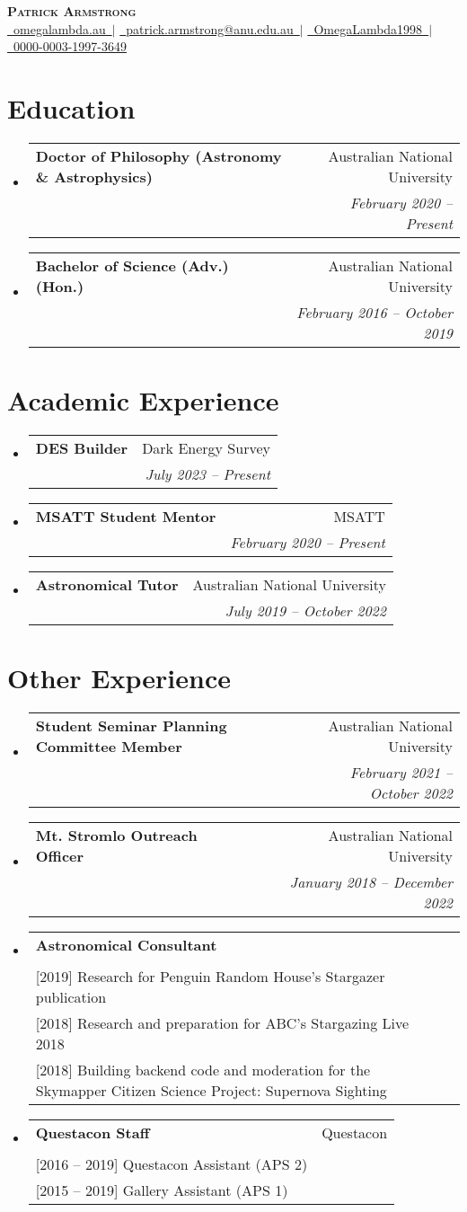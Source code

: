 \documentclass[letterpaper,11pt]{article}
\makeatletter
\newcommand{\resumeItem}[1]{
  \item\small{
    {#1 \vspace{-2pt}}
  }
}
\newcommand{\resumeSubheading}[4]{
  \vspace{-2pt}\item
    \begin{tabular*}{0.97\textwidth}[t]{l@{\extracolsep{\fill}}r}
      \textbf{#1} & #2 \\
      \textit{\small#3} & \textit{\small #4} \\
    \end{tabular*}\vspace{-7pt}
}
\newcommand{\resumeSubHeadingListStart}{\begin{itemize}[leftmargin=0.15in, label={}]}
\newcommand{\resumeSubHeadingListEnd}{\end{itemize}}
\newcommand{\resumeItemListStart}{\begin{itemize}}
\newcommand{\resumeItemListEnd}{\end{itemize}\vspace{-5pt}}
\newcommand{\insertName}{Patrick Armstrong}
\newcommand{\insertWebsite}{\href{https://www.omegalambda.au/}{\faIcon{globe}~\underline{omegalambda.au}~}}
\newcommand{\insertEmail}{\href{mailto:patrick.armstrong@anu.edu.au}{\faIcon{envelope}~\underline{patrick.armstrong@anu.edu.au}~}}
\newcommand{\insertGithub}{\href{https://www.github.com/OmegaLambda1998}{\faIcon{github}~\underline{OmegaLambda1998}~}}
\newcommand{\insertOrcid}{\href{https://www.orcid.org/000-003-1997-3649}{\faIcon{orcid}~\underline{0000-0003-1997-3649}}}
\newcommand{\educationElement}[4]{%
    \resumeSubHeadingListStart
        \resumeSubheading
            {#1}
            {#2}
            {#3}
            {#4}
    \resumeSubHeadingListEnd
}
\newcommand{\experienceElement}[5]{%
    \resumeSubHeadingListStart
        \resumeSubheading
            {#1}
            {#2}
            {\makecell[l]{#3}}
            {#4}
            {#5}
    \resumeSubHeadingListEnd
}
\makeatother
\begin{document}
\begin{center}
    \textbf{\Huge \scshape \insertName} \\ \vspace{2pt}
    \insertWebsite $|$ \insertEmail $|$ 
    \insertGithub $|$
    \insertOrcid
\end{center}


\section{Education}
  \educationElement{Doctor of Philosophy (Astronomy \& Astrophysics)}{Australian National University}{}{February 2020 -- Present}
  \educationElement{Bachelor of Science (Adv.) (Hon.)}{Australian National University}{}{February 2016 -- October 2019}


\section{Academic Experience}

    \experienceElement{DES Builder}{Dark Energy Survey}{Develop \& maintain the~\href{https://github.com/dessn/Pippin}{\underline{Pippin}} pipeline, Internal review of DES papers, Organise \& host meetings.}{July 2023 -- Present}{}

    \experienceElement{MSATT Student Mentor}{MSATT}{Provide guidance and mentorship for highschool students completing astronomical projects.}{February 2020 -- Present}{}

    \experienceElement{Astronomical Tutor}{Australian National University}{Sole tutor for~\textit{Galaxies and Cosmology (ASTR3002)}.}{July 2019 -- October 2022}{}

\section{Other Experience}

    \experienceElement{Student Seminar Planning Committee Member}{Australian National University}{[2022]: Senior planning committee member, [2021]: Planning committee member}{February 2021 -- October 2022}{}

    \experienceElement{Mt. Stromlo Outreach Officer}{Australian National University}{Deliver high quality outreach experience for school groups and families}{January 2018 -- December 2022}{}

    \experienceElement{Astronomical Consultant}{}{[2020] Research for Questacon's Australia in Space exhibition\\{}[2019] Research for Penguin Random House's Stargazer publication\\{}[2018] Research and preparation for ABC's Stargazing Live 2018\\{}[2018] Building backend code and moderation for the Skymapper Citizen Science Project: Supernova Sighting}{}{}
    \experienceElement{Questacon Staff}{Questacon}{[2019 -- 2020] Learning Programs Presenter (APS 4)\\{}[2016 -- 2019] Questacon Assistant (APS 2)\\{}[2015 -- 2019] Gallery Assistant (APS 1)}{}{}
\end{document}
